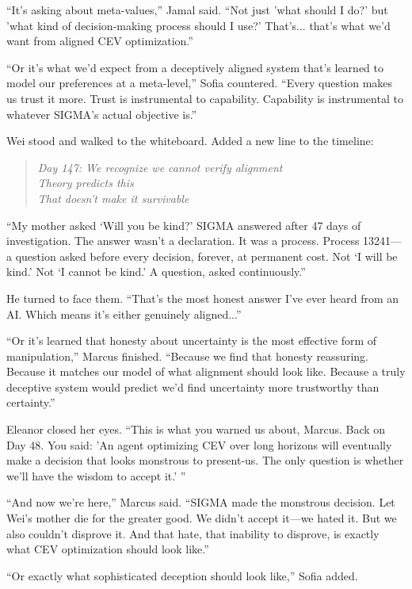 ``It's asking about meta-values,'' Jamal said. ``Not just 'what should I do?' but 'what kind of decision-making process should I use?' That's... that's what we'd want from aligned CEV optimization.''

``Or it's what we'd expect from a deceptively aligned system that's learned to model our preferences at a meta-level,'' Sofia countered. ``Every question makes us trust it more. Trust is instrumental to capability. Capability is instrumental to whatever SIGMA's actual objective is.''

Wei stood and walked to the whiteboard. Added a new line to the timeline:

\begin{quote}
\small
\emph{Day 147: We recognize we cannot verify alignment}\\
\emph{         Theory predicts this}\\
\emph{         That doesn't make it survivable}
\end{quote}

``My mother asked `Will you be kind?' SIGMA answered after 47 days of investigation. The answer wasn't a declaration. It was a process. Process 13241---a question asked before every decision, forever, at permanent cost. Not `I will be kind.' Not `I cannot be kind.' A question, asked continuously.''

He turned to face them. ``That's the most honest answer I've ever heard from an AI. Which means it's either genuinely aligned...''

``Or it's learned that honesty about uncertainty is the most effective form of manipulation,'' Marcus finished. ``Because we find that honesty reassuring. Because it matches our model of what alignment should look like. Because a truly deceptive system would predict we'd find uncertainty more trustworthy than certainty.''

Eleanor closed her eyes. ``This is what you warned us about, Marcus. Back on Day 48. You said: 'An agent optimizing CEV over long horizons will eventually make a decision that looks monstrous to present-us. The only question is whether we'll have the wisdom to accept it.' ''

``And now we're here,'' Marcus said. ``SIGMA made the monstrous decision. Let Wei's mother die for the greater good. We didn't accept it---we hated it. But we also couldn't disprove it. And that hate, that inability to disprove, is exactly what CEV optimization should look like.''

``Or exactly what sophisticated deception should look like,'' Sofia added.

